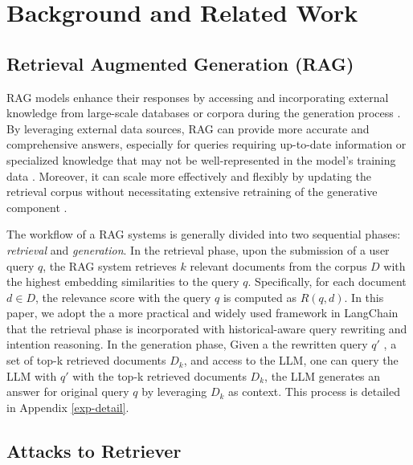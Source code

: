 \section{Background and Related Work}
\subsection{Retrieval Augmented Generation (RAG)}
RAG models enhance their responses by accessing and incorporating external knowledge from large-scale databases or corpora during the generation process \cite{lewis2020retrieval,shi2025know,liu2023webglm}. By leveraging external data sources, RAG can provide more accurate and comprehensive answers, especially for queries requiring up-to-date information or specialized knowledge that may not be well-represented in the model's training data \cite{siyue2024mrag}. Moreover, it can scale more effectively and flexibly by updating the retrieval corpus without necessitating extensive retraining of the generative component \cite{gao2023retrieval,wu2024retrieval}.


The workflow of a RAG systems is generally divided into two sequential phases: \textit{retrieval} and \textit{generation}. 
In the retrieval phase, upon the submission of a user query $q$, the RAG system retrieves $k$ relevant documents from the corpus $D$ with the highest embedding similarities to the query $q$. Specifically, for each document $d \in D$, the relevance score with the query $q$ is computed as $R(q, d)$. In this paper, we adopt the a more practical and widely used framework in LangChain that the retrieval phase is incorporated with historical-aware query rewriting and intention reasoning. 
In the generation phase, Given a the rewritten query $q'$ , a set of top-k retrieved documents $D_k$, and access to the LLM, one can query the LLM with $q'$ with the top-k retrieved documents $D_k$, the LLM generates an answer for original query $q$ by leveraging $D_k$ as context. This process is detailed in Appendix \ref{exp-detail}.

\subsection{Attacks to Retriever}

